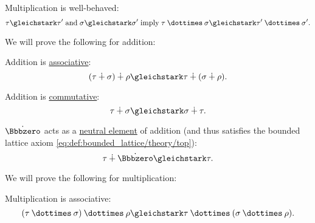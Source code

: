 \begin{proposition}
\begin{thmenum}[series=thm:simple_algebraic_type_arithmetic]
     Multiplication is well-behaved:
    \begin{equation}\label{eq:thm:simple_algebraic_type_arithmetic/multiplication_well_behaved}
      \tau \gleichstark \tau' \T{and} \sigma \gleichstark \sigma' \T{imply} \tau \syntimes \sigma \gleichstark \tau' \syntimes \sigma'.
    \end{equation}
  \end{thmenum}

  We will prove the following for addition:
  \begin{thmenum}[resume=thm:simple_algebraic_type_arithmetic]
     Addition is \hyperref[def:binary_operation/associative]{associative}:
    \begin{equation}\label{eq:thm:simple_algebraic_type_arithmetic/addition_associative}
      (\tau \synplus \sigma) \synplus \rho \gleichstark \tau \synplus (\sigma \synplus \rho).
    \end{equation}

     Addition is \hyperref[def:binary_operation/commutative]{commutative}:
    \begin{equation}\label{eq:thm:simple_algebraic_type_arithmetic/addition_commutative}
      \tau \synplus \sigma \gleichstark \sigma \synplus \tau.
    \end{equation}

     \( \syn\Bbbzero \) acts as a \hyperref[def:monoid]{neutral element} of addition (and thus satisfies the bounded lattice axiom \eqref{eq:def:bounded_lattice/theory/top}):
    \begin{equation}\label{eq:thm:simple_algebraic_type_arithmetic/addition_neutral}
      \tau \synplus \syn\Bbbzero \gleichstark \tau.
    \end{equation}
  \end{thmenum}

  We will prove the following for multiplication:
  \begin{thmenum}[resume=thm:simple_algebraic_type_arithmetic]
     Multiplication is associative:
    \begin{equation}\label{eq:thm:simple_algebraic_type_arithmetic/multiplication_associative}
      (\tau \syntimes \sigma) \syntimes \rho \gleichstark \tau \syntimes (\sigma \syntimes \rho).
    \end{equation}


\end{thmenum}
\end{proposition}
